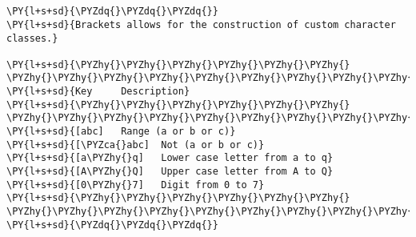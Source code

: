 

\section*{}

\begin{Verbatim}[commandchars=\\\{\}]
\PY{l+s+sd}{\PYZdq{}\PYZdq{}\PYZdq{}}
\PY{l+s+sd}{Brackets allows for the construction of custom character classes.}

\PY{l+s+sd}{\PYZhy{}\PYZhy{}\PYZhy{}\PYZhy{}\PYZhy{}\PYZhy{}  \PYZhy{}\PYZhy{}\PYZhy{}\PYZhy{}\PYZhy{}\PYZhy{}\PYZhy{}\PYZhy{}\PYZhy{}\PYZhy{}\PYZhy{}\PYZhy{}\PYZhy{}\PYZhy{}\PYZhy{}\PYZhy{}\PYZhy{}\PYZhy{}\PYZhy{}\PYZhy{}\PYZhy{}\PYZhy{}\PYZhy{}\PYZhy{}\PYZhy{}\PYZhy{}\PYZhy{}\PYZhy{}\PYZhy{}}
\PY{l+s+sd}{Key     Description}
\PY{l+s+sd}{\PYZhy{}\PYZhy{}\PYZhy{}\PYZhy{}\PYZhy{}\PYZhy{}  \PYZhy{}\PYZhy{}\PYZhy{}\PYZhy{}\PYZhy{}\PYZhy{}\PYZhy{}\PYZhy{}\PYZhy{}\PYZhy{}\PYZhy{}\PYZhy{}\PYZhy{}\PYZhy{}\PYZhy{}\PYZhy{}\PYZhy{}\PYZhy{}\PYZhy{}\PYZhy{}\PYZhy{}\PYZhy{}\PYZhy{}\PYZhy{}\PYZhy{}\PYZhy{}\PYZhy{}\PYZhy{}\PYZhy{}}
\PY{l+s+sd}{[abc]   Range (a or b or c)}
\PY{l+s+sd}{[\PYZca{}abc]  Not (a or b or c)}
\PY{l+s+sd}{[a\PYZhy{}q]   Lower case letter from a to q}
\PY{l+s+sd}{[A\PYZhy{}Q]   Upper case letter from A to Q}
\PY{l+s+sd}{[0\PYZhy{}7]   Digit from 0 to 7}
\PY{l+s+sd}{\PYZhy{}\PYZhy{}\PYZhy{}\PYZhy{}\PYZhy{}\PYZhy{}  \PYZhy{}\PYZhy{}\PYZhy{}\PYZhy{}\PYZhy{}\PYZhy{}\PYZhy{}\PYZhy{}\PYZhy{}\PYZhy{}\PYZhy{}\PYZhy{}\PYZhy{}\PYZhy{}\PYZhy{}\PYZhy{}\PYZhy{}\PYZhy{}\PYZhy{}\PYZhy{}\PYZhy{}\PYZhy{}\PYZhy{}\PYZhy{}\PYZhy{}\PYZhy{}\PYZhy{}\PYZhy{}\PYZhy{}}
\PY{l+s+sd}{\PYZdq{}\PYZdq{}\PYZdq{}}
\end{Verbatim}
